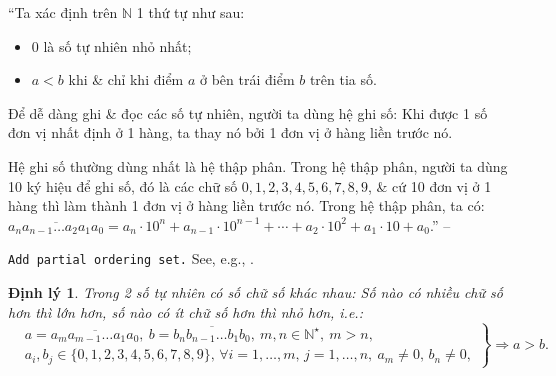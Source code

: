 \documentclass[oneside]{book}
\numberwithin{equation}{section}
\newtheorem{dinhly}{Định lý}[section]
\begin{document}
``Ta xác định trên $\mathbb{N}$ 1 thứ tự như sau:
\begin{itemize}
	\item 0 là số tự nhiên nhỏ nhất;
	\item $a < b$ khi \& chỉ khi điểm $a$ ở bên trái điểm $b$ trên tia số.
\end{itemize}
Để dễ dàng ghi \& đọc các số tự nhiên, người ta dùng hệ ghi số: Khi được 1 số đơn vị nhất định ở 1 hàng, ta thay nó bởi 1 đơn vị ở hàng liền trước nó.

Hệ ghi số thường dùng nhất là hệ thập phân. Trong hệ thập phân, người ta dùng 10 ký hiệu để ghi số, đó là các chữ số $0,1,2,3,4,5,6,7,8,9$, \& cứ 10 đơn vị ở 1 hàng thì làm thành 1 đơn vị ở hàng liền trước nó. Trong hệ thập phân, ta có: $\overline{a_na_{n-1}\ldots a_2a_1a_0} = a_n\cdot 10^n + a_{n-1}\cdot 10^{n-1} + \cdots + a_2\cdot 10^2 + a_1\cdot 10 + a_0$.'' -- \cite{Binh_Toan_6_tap_1}

\texttt{Add partial ordering set.} See, e.g., \cite{Halmos1960, Halmos1974, Kaplansky1972, Kaplansky1977}.

\begin{dinhly}
	Trong 2 số tự nhiên có số chữ số khác nhau: Số nào có nhiều chữ số hơn thì lớn hơn, số nào có ít chữ số hơn thì nhỏ hơn, i.e.:
	\begin{equation}
		\label{compare number of digits}
		\left.\begin{split}
			&a = \overline{a_ma_{m-1}\ldots a_1a_0},\ b = \overline{b_nb_{n-1}\ldots b_1b_0},\ m,n\in\mathbb{N}^\star,\ m > n,\\
			&a_i,b_j\in\{0,1,2,3,4,5,6,7,8,9\},\,\forall i = 1,\ldots,m,\,j = 1,\ldots,n,\ a_m\ne 0,\,b_n\ne 0,
		\end{split}\right\}\Rightarrow a > b.		
	\end{equation}
\end{dinhly}
\end{document}
